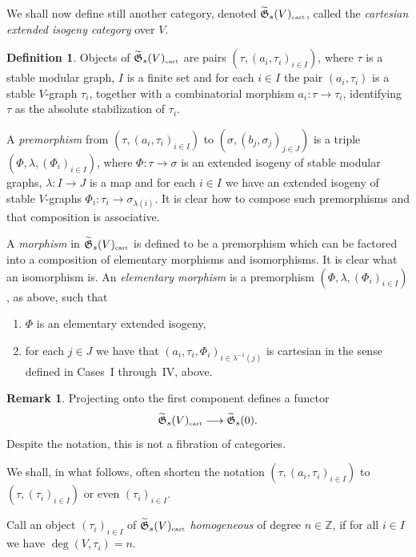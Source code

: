 \documentclass[11pt]{amsart}
\theoremstyle{definition}
\newtheorem{defn}[prop]{Definition}
\newtheorem{numrmk}[prop]{Remark}
\theoremstyle{remark}
\renewcommand{\tilde}{\widetilde}
\newcommand{\cart}{{\mbox{\tiny cart}}}
\newcommand{\GG}{{\mathfrak{G}}}
\newcommand{\zz}{{\mathbb{Z}}}
\theoremstyle{plain}
\theoremstyle{definition}
\theoremstyle{remark}
\begin{document}
We shall now define still another category, denoted \(\tilde{\GG}_s(V)_{\cart}\),
called the {\em cartesian extended
isogeny category }over \(V\).

\begin{defn} \label{ceicv}
Objects of \(\tilde{\GG}_s(V)_\cart\) are pairs \((\tau,(a_i,\tau_i)_{i\in I})\),
where \(\tau\) is a stable modular graph, \(I\)
is a finite set and for each \(i\in I\) the pair \((a_i,\tau_i)\) is a stable
\(V\)-graph \(\tau_i\), together with a
combinatorial morphism \(a_i:\tau\rightarrow\tau_i\), identifying \(\tau\) as the
absolute stabilization of \(\tau_i\).

A {\em premorphism } from \((\tau,(a_i,\tau_i)_{i\in I})\) to
\((\sigma,(b_j,\sigma_j)_{j\in J})\) is a triple
\((\Phi,\lambda,(\Phi_i)_{i\in I})\), where \(\Phi:\tau\rightarrow\sigma\) is an
extended isogeny of stable modular graphs,
\(\lambda:I\rightarrow J\) is a map and for each \(i\in I\) we have an extended
isogeny of stable \(V\)-graphs
\(\Phi_i:\tau_i\rightarrow\sigma_{\lambda(i)}\). It is clear how to compose such
premorphisms and that composition is
associative.

A {\em morphism }in \(\tilde{\GG}_s(V)_\cart\) is defined to be a premorphism
which can be factored into a composition of
elementary morphisms and isomorphisms. It is clear what an isomorphism is. An
{\em elementary morphism }is a premorphism
\((\Phi,\lambda,(\Phi_i)_{i\in I})\), as above, such that
\begin{enumerate}
\item \(\Phi\) is an elementary extended isogeny,
\item for each \(j\in J\) we have that
\((a_i,\tau_i,\Phi_i)_{i\in\lambda^{-1}(j)}\) is cartesian in the sense defined
in
Cases~I through~IV, above.
\end{enumerate}
\end{defn}

\begin{numrmk} \label{cfnc}
Projecting onto the first component defines a functor
\[
\tilde{\GG}_s(V)_\cart\longrightarrow\tilde{\GG}_s(0).
\]
Despite the notation, this is not a fibration of categories.
\end{numrmk}

We shall, in what follows, often shorten the notation \((\tau,(a_i,\tau_i)_{i\in
I})\) to \((\tau,(\tau_i)_{i\in I})\) or
even \((\tau_i)_{i\in I}\).

Call an object \((\tau_i)_{i\in I}\) of \(\tilde{\GG}_s(V)_\cart\) {\em homogeneous
} of degree \(n\in\zz\), if for all \(i\in
I\) we have \(\deg(V,\tau_i)=n\).
\end{document}
